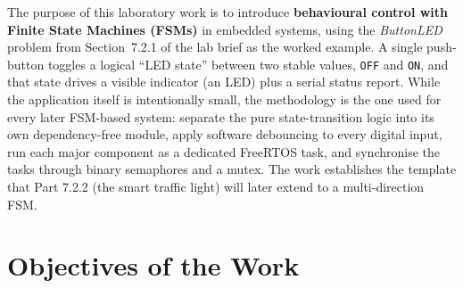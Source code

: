 \documentclass[12pt]{article}
\begin{document}
The purpose of this laboratory work is to introduce \textbf{behavioural control with Finite State Machines (FSMs)} in embedded systems, using the \emph{ButtonLED} problem from Section~7.2.1 of the lab brief as the worked example. A single push-button toggles a logical \enquote{LED state} between two stable values, \texttt{OFF} and \texttt{ON}, and that state drives a visible indicator (an LED) plus a serial status report. While the application itself is intentionally small, the methodology is the one used for every later FSM-based system: separate the pure state-transition logic into its own dependency-free module, apply software debouncing to every digital input, run each major component as a dedicated FreeRTOS task, and synchronise the tasks through binary semaphores and a mutex. The work establishes the template that Part 7.2.2 (the smart traffic light) will later extend to a multi-direction FSM.

\section{Objectives of the Work}
\end{document}

